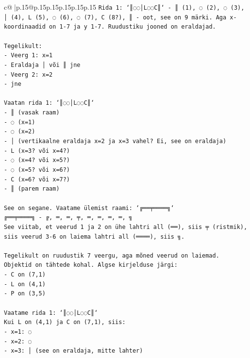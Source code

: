\documentclass{article}
\begin{document}
{\begin{supertabular}{c@{$\;$}|p{.15\linewidth}@{}p{.15\linewidth}p{.15\linewidth}p{.15\linewidth}p{.15\linewidth}p{.15\linewidth}}
{{{\texttt{Rida 1: `║◌◌│L◌◌C║` {-} ║ (1), ◌ (2), ◌ (3), │ (4), L (5), ◌ (6), ◌ (7), C (8?), ║ {-} oot, see on 9 märki. Aga x{-}koordinaadid on 1{-}7 ja y 1{-}7. Ruudustiku jooned on eraldajad.} \\
\\ 
\texttt{Tegelikult:} \\
\texttt{{-} Veerg 1: x=1} \\
\texttt{{-} Eraldaja │ või ║ jne} \\
\texttt{{-} Veerg 2: x=2} \\
\texttt{{-} jne} \\
\\ 
\texttt{Vaatan rida 1: `║◌◌│L◌◌C║`} \\
\texttt{{-} ║ (vasak raam)} \\
\texttt{{-} ◌ (x=1)} \\
\texttt{{-} ◌ (x=2)} \\
\texttt{{-} │ (vertikaalne eraldaja x=2 ja x=3 vahel? Ei, see on eraldaja)} \\
\texttt{{-} L (x=3? või x=4?)} \\
\texttt{{-} ◌ (x=4? või x=5?)} \\
\texttt{{-} ◌ (x=5? või x=6?)} \\
\texttt{{-} C (x=6? või x=7?)} \\
\texttt{{-} ║ (parem raam)} \\
\\ 
\texttt{See on segane. Vaatame ülemist raami: `╔══╤════╗`} \\
\texttt{╔══╤════╗ {-} ╔, ═, ═, ╤, ═, ═, ═, ═, ╗} \\
\texttt{See viitab, et veerud 1 ja 2 on ühe lahtri all (══), siis ╤ (ristmik), siis veerud 3{-}6 on laiema lahtri all (════), siis ╗.} \\
\\ 
\texttt{Tegelikult on ruudustik 7 veergu, aga mõned veerud on laiemad. Objektid on tähtede kohal. Algse kirjelduse järgi:} \\
\texttt{{-} C on (7,1)} \\
\texttt{{-} L on (4,1)} \\
\texttt{{-} P on (3,5)} \\
\\ 
\texttt{Vaatame rida 1: `║◌◌│L◌◌C║`} \\
\texttt{Kui L on (4,1) ja C on (7,1), siis:} \\
\texttt{{-} x=1: ◌} \\
\texttt{{-} x=2: ◌} \\
\texttt{{-} x=3: │ (see on eraldaja, mitte lahter)} \\
}}}
\end{supertabular}}
\end{document}
